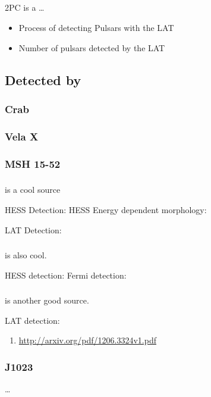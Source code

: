 \subsection{}

\Gls{2PC} is a \ldots
{}

\begin{itemize}
  \item Process of detecting Pulsars with the \gls{LAT}
  \item Number of pulsars detected by the \gls{LAT}
\end{itemize}

\subsection{ Detected by }

\subsubsection{Crab}

\subsubsection{Vela X}

\subsubsection{MSH 15-52}


\subsubsection{}

 is a cool source

HESS Detection: 
HESS Energy dependent morphology: \cite{aharonian_2006a_energy-dependent}

LAT Detection: \cite{grondin_2011_detection-pulsar}



\subsubsection{}

 is also cool.

HESS detection:  \cite{aharonian_2006a_h.e.s.s.-survey}
Fermi detection: \cite{slane_2010_fermi-detection}

\subsubsection{}

 is another good source.

LAT detection: \cite{rousseau_2012_fermi-lat-constraints}

\begin{enumerate}
  \item \url{http://arxiv.org/pdf/1206.3324v1.pdf}
\end{enumerate}

\subsubsection{J1023}

\ldots

